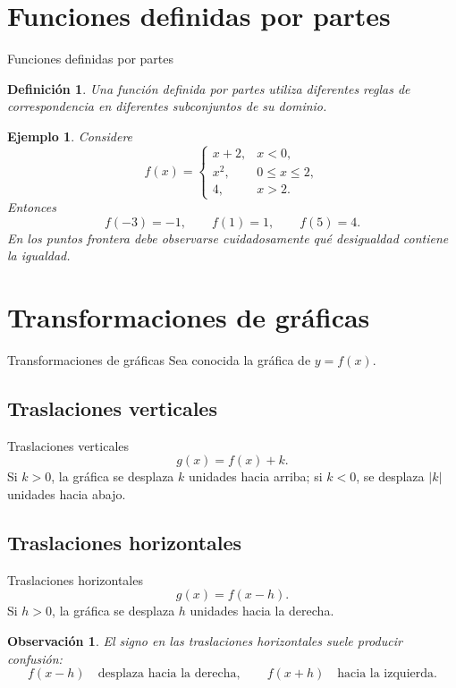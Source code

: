 \documentclass[aspectratio=169,10pt]{beamer}
\newtheorem{definicion}{Definición}
\newtheorem{observacion}{Observación}
\newtheorem{ejemplo}{Ejemplo}
\begin{document}
\section{Funciones definidas por partes}
\begin{frame}{Funciones definidas por partes}
\begin{definicion}
Una función definida por partes utiliza diferentes reglas de correspondencia en
diferentes subconjuntos de su dominio.
\end{definicion}

\begin{ejemplo}
Considere
\[
f(x)=
\begin{cases}
x+2,&x<0,\\
x^2,&0\leq x\leq2,\\
4,&x>2.
\end{cases}
\]
Entonces
\[
f(-3)=-1,\qquad f(1)=1,\qquad f(5)=4.
\]
En los puntos frontera debe observarse cuidadosamente qué desigualdad contiene
la igualdad.
\end{ejemplo}

\end{frame}
\section{Transformaciones de gráficas}
\begin{frame}{Transformaciones de gráficas}
Sea conocida la gráfica de $y=f(x)$.
\end{frame}
\subsection*{Traslaciones verticales}
\begin{frame}{Traslaciones verticales}
\[
g(x)=f(x)+k.
\]
Si $k>0$, la gráfica se desplaza $k$ unidades hacia arriba; si $k<0$, se
desplaza $|k|$ unidades hacia abajo.
\end{frame}
\subsection*{Traslaciones horizontales}
\begin{frame}{Traslaciones horizontales}
\[
g(x)=f(x-h).
\]
Si $h>0$, la gráfica se desplaza $h$ unidades hacia la derecha.

\begin{observacion}
El signo en las traslaciones horizontales suele producir confusión:
\[
f(x-h)\quad\text{desplaza hacia la derecha},
\qquad
f(x+h)\quad\text{hacia la izquierda}.
\]
\end{observacion}
\end{frame}
\end{document}
